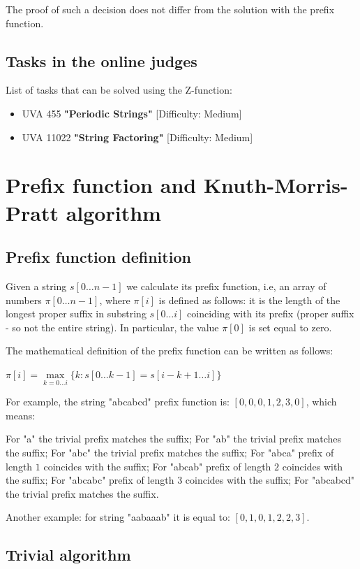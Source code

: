 The proof of such a decision does not differ from the solution with the prefix function.

\subsection{ Tasks in the online judges }

List of tasks that can be solved using the Z-function:
\begin{itemize}
\item UVA 455 \textbf{"Periodic Strings"} [Difficulty: Medium]
\item UVA 11022 \textbf{"String Factoring"} [Difficulty: Medium]
\end{itemize}

\section{ Prefix function and Knuth-Morris-Pratt algorithm } %
\subsection{ Prefix function definition }

Given a string $s [0 \ldots n-1]$ we calculate its prefix function, i.e, an array of numbers $\pi [0 \ldots n-1]$, where $\pi [i]$ is defined as follows: it is the length of the longest proper suffix in substring $s [0 \ldots i]$ coinciding with its prefix (proper suffix - so not the entire string). In particular, the value $\pi [0]$ is set equal to zero.

The mathematical definition of the prefix function can be written as follows:

$\pi[i]=\underset{k=0\ldots i}{\max}\{k:s[0\ldots k-1]=s[i-k+1\ldots i]\}$

For example, the string "abcabcd" prefix function is: $[0, 0, 0, 1, 2, 3, 0]$, which means:

For "a" the trivial prefix matches the suffix;
For "ab" the trivial prefix matches the suffix;
For "abc" the trivial prefix matches the suffix;
For "abca" prefix of length $1$ coincides with the suffix;
For "abcab" prefix of length $2$ coincides with the suffix;
For "abcabc" prefix of length $3$ coincides with the suffix;
For "abcabcd" the trivial prefix matches the suffix.

Another example: for string "aabaaab" it is equal to: $[0, 1, 0, 1, 2, 2, 3]$.

\subsection{ Trivial algorithm }

